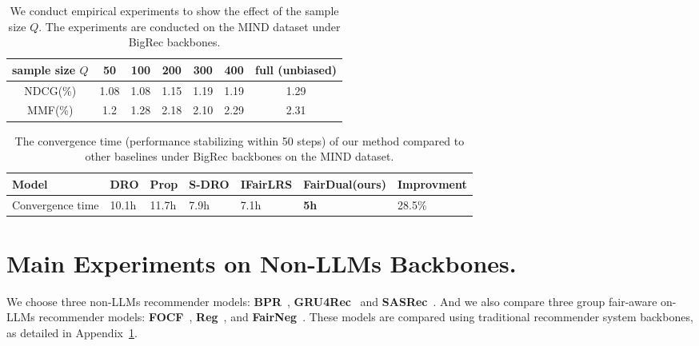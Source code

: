 \begin{table}[t]
\centering
\caption{We conduct empirical experiments to show the effect of the sample size $Q$. The experiments are conducted on the MIND dataset under BigRec backbones.}
\label{tab:sample_size}
\begin{tabular}{ccccccc}
\toprule
\textbf{sample size $Q$} & \textbf{50} & \textbf{100} & \textbf{200} & \textbf{300} & \textbf{400} & \textbf{full (unbiased)} \\ \midrule
NDCG(\%) & 1.08            & 1.08           & 1.15              & 1.19            & 1.19             & 1.29            \\
MMF(\%)                       & 1.2             & 1.28           & 2.18              & 2.10            & 2.29             & 2.31            \\
\bottomrule
\end{tabular}
\end{table}

\begin{table}[t]
\centering
\caption{The convergence time (performance stabilizing within 50 steps) of our method compared to other baselines under BigRec backbones on the MIND dataset. }
\label{tab:convergence}
\begin{tabular}{lllllll}
\toprule
Model            & DRO   & Prop  & S-DRO & IFairLRS & \textbf{FairDual(ours)} & Improvment \\ \midrule
Convergence time & 10.1h & 11.7h & 7.9h  & 7.1h     & \textbf{5h}             & 28.5\%  \\ \bottomrule
\end{tabular}
\end{table}



\section{Main Experiments on Non-LLMs Backbones.}\label{app:sec:non_llms}

We choose three non-LLMs recommender models: \textbf{BPR}~\citep{BPR}, \textbf{GRU4Rec}~\citep{gru4rec} and \textbf{SASRec}~\citep{SASRec}.
And we also compare three group fair-aware on-LLMs recommender models: \textbf{FOCF}~\citep{FOCF},  \textbf{Reg}~\citep{Reg}, and  \textbf{FairNeg}~\citep{FairNeg}. These models are compared using traditional recommender system backbones, as detailed in Appendix~\ref{app:sec:non_llms}.

